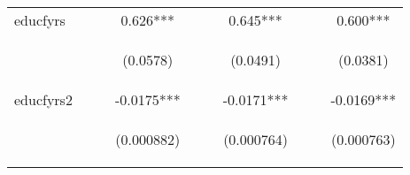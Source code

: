 \documentclass{article}[11pt,subeqn]
\begin{document}
\begin{spacing}{1.25}
\begin{sidewaystable}[!htbp]
\begin{center}
\begin{tabular}{lccccccccc}
educfyrs &  &  & 0.626*** &  &  & 0.645*** &  &  & 0.600*** \\
\vspace{4pt} & \begin{footnotesize}\end{footnotesize} & \begin{footnotesize}\end{footnotesize} & \begin{footnotesize}(0.0578)\end{footnotesize} & \begin{footnotesize}\end{footnotesize} & \begin{footnotesize}\end{footnotesize} & \begin{footnotesize}(0.0491)\end{footnotesize} & \begin{footnotesize}\end{footnotesize} & \begin{footnotesize}\end{footnotesize} & \begin{footnotesize}(0.0381)\end{footnotesize} \\
educfyrs2 &  &  & -0.0175*** &  &  & -0.0171*** &  &  & -0.0169*** \\
\vspace{4pt} & \begin{footnotesize}\end{footnotesize} & \begin{footnotesize}\end{footnotesize} & \begin{footnotesize}(0.000882)\end{footnotesize} & \begin{footnotesize}\end{footnotesize} & \begin{footnotesize}\end{footnotesize} & \begin{footnotesize}(0.000764)\end{footnotesize} & \begin{footnotesize}\end{footnotesize} & \begin{footnotesize}\end{footnotesize} & \begin{footnotesize}(0.000763)\end{footnotesize} \\

\end{tabular}
\end{center}
\end{sidewaystable}
\end{spacing}
\end{document}
